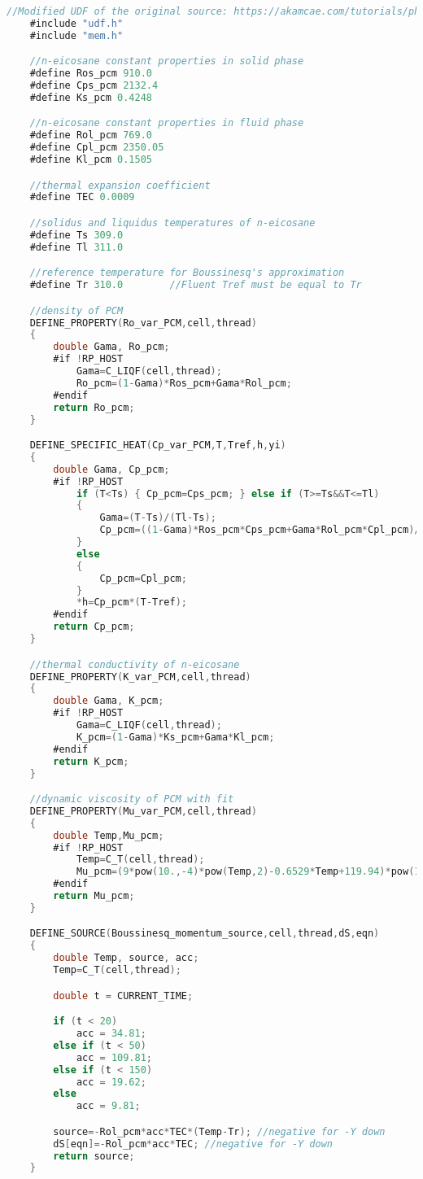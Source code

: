 \newpage

\begin{lstlisting}[language=C, caption={Vollständige \ac{pcm} \ac{udf} eicosane.c für temperaturabhängige Eigenschaften}, label={lst:udf_rest}]
    //Modified UDF of the original source: https://akamcae.com/tutorials/phase-change-material-simulation-in-ansys-fluent/
    #include "udf.h"
    #include "mem.h"

    //n-eicosane constant properties in solid phase
    #define Ros_pcm 910.0
    #define Cps_pcm 2132.4
    #define Ks_pcm 0.4248

    //n-eicosane constant properties in fluid phase
    #define Rol_pcm 769.0
    #define Cpl_pcm 2350.05
    #define Kl_pcm 0.1505

    //thermal expansion coefficient
    #define TEC 0.0009

    //solidus and liquidus temperatures of n-eicosane
    #define Ts 309.0
    #define Tl 311.0

    //reference temperature for Boussinesq's approximation
    #define Tr 310.0		//Fluent Tref must be equal to Tr

    //density of PCM
    DEFINE_PROPERTY(Ro_var_PCM,cell,thread)
    {
        double Gama, Ro_pcm;
        #if !RP_HOST
            Gama=C_LIQF(cell,thread);
            Ro_pcm=(1-Gama)*Ros_pcm+Gama*Rol_pcm;
        #endif
        return Ro_pcm;
    }

    DEFINE_SPECIFIC_HEAT(Cp_var_PCM,T,Tref,h,yi)
    {
        double Gama, Cp_pcm;
        #if !RP_HOST
            if (T<Ts) { Cp_pcm=Cps_pcm; } else if (T>=Ts&&T<=Tl)
            {
                Gama=(T-Ts)/(Tl-Ts);
                Cp_pcm=((1-Gama)*Ros_pcm*Cps_pcm+Gama*Rol_pcm*Cpl_pcm)/((1-Gama)*Ros_pcm+Gama*Rol_pcm);
            }
            else
            {
                Cp_pcm=Cpl_pcm;
            }
            *h=Cp_pcm*(T-Tref);
        #endif
        return Cp_pcm;
    }

    //thermal conductivity of n-eicosane
    DEFINE_PROPERTY(K_var_PCM,cell,thread)
    {
        double Gama, K_pcm;
        #if !RP_HOST
            Gama=C_LIQF(cell,thread);
            K_pcm=(1-Gama)*Ks_pcm+Gama*Kl_pcm;
        #endif
        return K_pcm;
    }

    //dynamic viscosity of PCM with fit
    DEFINE_PROPERTY(Mu_var_PCM,cell,thread)
    {
        double Temp,Mu_pcm;
        #if !RP_HOST
            Temp=C_T(cell,thread);
            Mu_pcm=(9*pow(10.,-4)*pow(Temp,2)-0.6529*Temp+119.94)*pow(10.,-3);
        #endif
        return Mu_pcm;
    }

    DEFINE_SOURCE(Boussinesq_momentum_source,cell,thread,dS,eqn)
    {
        double Temp, source, acc;
        Temp=C_T(cell,thread);

        double t = CURRENT_TIME;

        if (t < 20)
            acc = 34.81;
        else if (t < 50)
            acc = 109.81;
        else if (t < 150)
            acc = 19.62;
        else
            acc = 9.81;

        source=-Rol_pcm*acc*TEC*(Temp-Tr); //negative for -Y down
        dS[eqn]=-Rol_pcm*acc*TEC; //negative for -Y down
        return source;
    }
\end{lstlisting}

